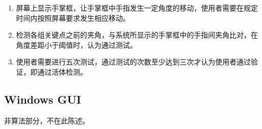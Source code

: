 \documentclass[UTF8]{ctexart}
\begin{document}
		\begin{enumerate}
			
			\item 屏幕上显示手掌框，让手掌框中手指发生一定角度的移动，使用者需要在规定时间内按照屏幕要求发生相应移动。 
			
			\item 检测各组关键点之前的夹角，与系统所显示的手掌框中的手指间夹角比对，在角度差距小于阈值时，认为通过测试。
			
			\item 使用者需要进行五次测试，通过测试的次数至少达到三次才认为使用者通过验证，即通过活体检测。
			
		\end{enumerate}
		
	\subsection{Windows GUI}
	
		非算法部分，不在此陈述。
\end{document}
